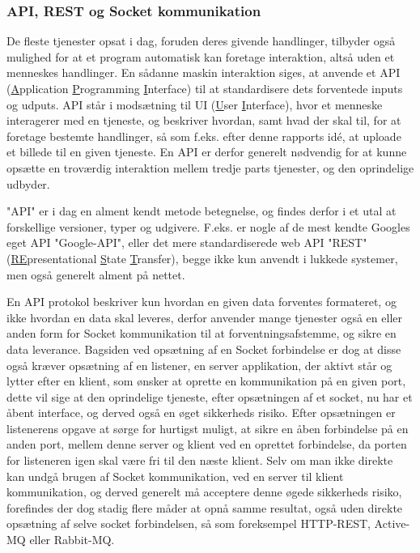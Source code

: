 \subsubsection{API, REST og Socket kommunikation}
De fleste tjenester opsat i dag, foruden deres givende handlinger, tilbyder også mulighed for at et program automatisk kan foretage interaktion, altså uden et menneskes handlinger. En sådanne maskin interaktion siges, at anvende et API (\underline{A}pplication \underline{P}rogramming \underline{I}nterface) til at standardisere dets forventede inputs og udputs. 
API står i modsætning til UI (\underline{U}ser \underline{I}nterface), hvor et menneske interagerer med en tjeneste, og beskriver hvordan, samt hvad der skal til, for at foretage bestemte handlinger, så som f.eks. efter denne rapports idé, at uploade et billede til en given tjeneste. En API er derfor generelt nødvendig for at kunne opsætte en troværdig interaktion mellem tredje parts tjenester, og den oprindelige udbyder. \cite{WhatIsAPI}

"API" er i dag en alment kendt metode betegnelse, og findes derfor i et utal at forskellige versioner, typer og udgivere. F.eks. er nogle af de mest kendte Googles eget API "Google-API", eller det mere standardiserede web API "REST" (\underline{RE}presentational \underline{S}tate \underline{T}ransfer), begge ikke kun anvendt i lukkede systemer, men også generelt alment på nettet. \cite{codecademy_REST}

En API protokol beskriver kun hvordan en given data forventes formateret, og ikke hvordan en data skal leveres, derfor anvender mange tjenester også en eller anden form for Socket kommunikation til at forventningsafstemme, og sikre en data leverance. Bagsiden ved opsætning af en Socket forbindelse er dog at disse også kræver opsætning af en listener, en server applikation, der aktivt står og lytter efter en klient, som ønsker at oprette en kommunikation på en given port, dette vil sige at den oprindelige tjeneste, efter opsætningen af et socket, nu har et åbent interface, og derved også en øget sikkerheds risiko. Efter opsætningen er listenerens opgave at sørge for hurtigst muligt, at sikre en åben forbindelse på en anden port, mellem denne server og klient ved en oprettet forbindelse, da porten for listeneren igen skal være fri til den næste klient. \cite{WhatIsSocket} Selv om man ikke direkte kan undgå brugen af Socket kommunikation, ved en server til klient kommunikation, og derved generelt må acceptere denne øgede sikkerheds risiko, forefindes der dog stadig flere måder at opnå samme resultat, også uden direkte opsætning af selve socket forbindelsen, så som foreksempel HTTP-REST, Active-MQ eller Rabbit-MQ. \cite{SocketAlternatives}

